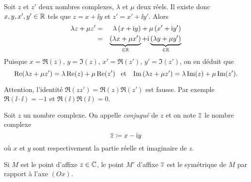 \documentclass{magnolia}
\begin{document}
\begin{preuve}
Soit $z$ et $z'$ deux nombres complexes, $\lambda$ et $\mu$ deux réels.
Il existe donc $x,y,x',y'\in\mathbb{R}$ tels que $z=x+\ii y$ et $z'=x'+\ii y'$. Alors
\begin{eqnarray*}
\lambda z+\mu z'
&=& \lambda\left(x+{\rm i} y\right)+\mu\left(x'+{\rm i} y'\right)\\
&=& \underbrace{\left(\lambda x+\mu x'\right)}_{\in\mathbb{R}}+{\rm i}
    \underbrace{\left(\lambda y+\mu y'\right)}_{\in\mathbb{R}}
\end{eqnarray*}
Puisque $x=\Re(z)$, $y=\Im(z)$, $x'=\Re(z')$, $y'=\Im(z')$, on en déduit que
\[\mathop{\rm Re}(\lambda z+\mu z')=\lambda\mathop{\rm Re}(z)+\mu\mathop{\rm Re}(z') \quad\!\text{et}\quad\!
  \mathop{\rm Im}\left(\lambda z+\mu z'\right)=\lambda\mathop{\rm Im}(z)+\mu\mathop{\rm Im}(z').\]
\end{preuve}

\begin{remarqueUnique}
\remarque Attention, l'identité $\Re(z z')=\Re(z)\Re(z')$ est fausse.
  Par exemple $\Re(\ii\cdot \ii)=-1$ et $\Re(\ii)\Re(\ii)=0$.
\end{remarqueUnique}

\begin{definition}[utile=-3]
  Soit $z$ un nombre complexe. On appelle \emph{conjugué} de $z$ et on note
  $\overline{z}$ le nombre complexe
  $$\overline{z}\coloneqq x-{\rm i} y$$
  où $x$ et $y$ sont respectivement la partie réelle et imaginaire de $z$.
\end{definition}

\begin{remarqueUnique}
\remarque Si $M$ est le point d'affixe $z\in\mathbb{C}$, le point $M'$ d'affixe $\overline{z}$ est le symétrique de $M$ par rapport à l'axe $(Ox).$
\end{remarqueUnique}
\end{document}
